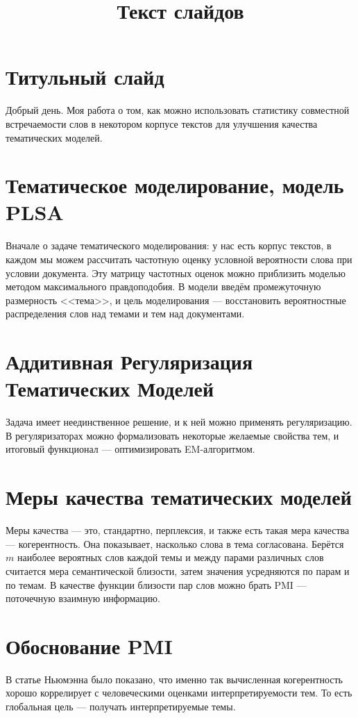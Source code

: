 \documentclass[10pt]{extarticle}
\title{Текст слайдов}
\begin{document}
\maketitle
    \section{Титульный слайд}
    Добрый день. Моя работа о том, как можно использовать статистику совместной встречаемости слов в некотором корпусе текстов для улучшения качества тематических моделей.
    \section{Тематическое моделирование, модель PLSA}
    Вначале о задаче тематического моделирования: у нас есть корпус текстов, в каждом мы можем рассчитать частотную оценку условной вероятности слова при условии документа. Эту матрицу частотных оценок можно приблизить моделью методом максимального правдоподобия. В модели введём промежуточную размерность <<тема>>, и цель моделирования --- восстановить вероятностные распределения слов над темами и тем над документами.
    \section{Аддитивная Регуляризация Тематических Моделей}
    Задача имеет неединственное решение, и к ней можно применять регуляризацию. В регуляризаторах можно формализовать некоторые желаемые свойства тем, и итоговый функционал --- оптимизировать EM-алгоритмом.
    \section{Меры качества тематических моделей}
    Меры качества --- это, стандартно, перплексия, и также есть такая мера качества --- когерентность. Она показывает, насколько слова в тема согласована. Берётся $m$ наиболее вероятных слов каждой темы и между парами различных слов считается мера семантической близости, затем значения усредняются по парам и по темам. В качестве функции близости пар слов можно брать PMI --- поточечную взаимную информацию.
    \section{Обоснование PMI}
    В статье Ньюмэнна было показано, что именно так вычисленная когерентность хорошо коррелирует с человеческими оценками интерпретируемости тем. То есть глобальная цель --- получать интерпретируемые темы.
\end{document}
